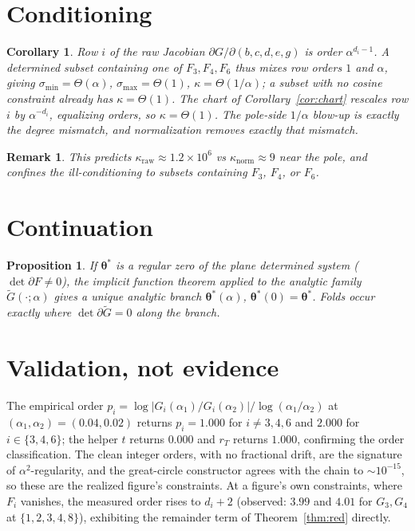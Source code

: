 \documentclass[pdflatex,sn-mathphys-num]{sn-jnl}
\theoremstyle{thmstyleone}%
\newtheorem{corollary}{Corollary}%
\newtheorem{proposition}{Proposition}%
\theoremstyle{thmstyletwo}%
\newtheorem{remark}{Remark}%
\theoremstyle{thmstylethree}%
\begin{document}
\section{Conditioning}
\begin{corollary}\label{cor:cond}
Row $i$ of the raw Jacobian $\partial G/\partial(b,c,d,e,g)$ is order $\alpha^{d_i-1}$.
A determined subset containing one of $F_3,F_4,F_6$ thus mixes row orders $1$ and
$\alpha$, giving $\sigma_{\min}=\Theta(\alpha)$, $\sigma_{\max}=\Theta(1)$,
$\kappa=\Theta(1/\alpha)$; a subset with no cosine constraint already has
$\kappa=\Theta(1)$. The chart of Corollary~\ref{cor:chart} rescales row $i$ by
$\alpha^{-d_i}$, equalizing orders, so $\kappa=\Theta(1)$. The pole-side $1/\alpha$
blow-up is exactly the degree mismatch, and normalization removes exactly that mismatch.
\end{corollary}
\begin{remark}
This predicts $\kappa_{\mathrm{raw}}\approx1.2\times10^{6}$ vs $\kappa_{\mathrm{norm}}\approx9$ near the pole, and confines the ill-conditioning to subsets containing $F_3$, $F_4$, or $F_6$.
\end{remark}

\section{Continuation}
\begin{proposition}\label{prop:cont}
If $\boldsymbol\theta^\ast$ is a regular zero of the plane determined system
($\det\partial F\neq0$), the implicit function theorem applied to the analytic family
$\widetilde G(\cdot;\alpha)$ gives a unique analytic branch $\boldsymbol\theta^\ast(\alpha)$, $\boldsymbol\theta^\ast(0)=\boldsymbol\theta^\ast$. 
Folds occur exactly where $\det\partial\widetilde G=0$ along the branch.
\end{proposition}

\section{Validation, not evidence}
The empirical order $p_i=\log|G_i(\alpha_1)/G_i(\alpha_2)|/\log(\alpha_1/\alpha_2)$ at $(\alpha_1,\alpha_2)=(0.04,0.02)$ returns $p_i=1.000$ for $i\neq3,4,6$ and $2.000$ for $i\in\{3,4,6\}$; the helper $t$ returns $0.000$ and $r_T$ returns $1.000$, confirming the order classification. The clean integer orders, with no fractional drift, are the signature of $\alpha^2$-regularity, and the great-circle constructor agrees with the chain to $\sim10^{-15}$, so these are the realized figure's constraints. At a figure's own constraints, where $F_i$ vanishes, the measured order rises to $d_i+2$ (observed: $3.99$ and $4.01$ for $G_3,G_4$ at $\{1,2,3,4,8\}$), exhibiting the remainder term of Theorem~\ref{thm:red} directly.
\end{document}

